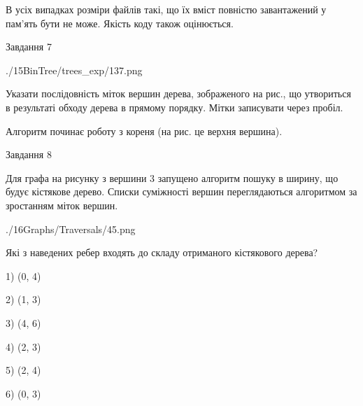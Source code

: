 \documentclass[12pt, ukrainian]{article}
\begin{document}
{В усіх випадках розміри файлів такі, що їх вміст повністю завантажений у пам'ять бути не може. Якість коду також оцінюється.



\vspace{10mm}\par

\newpage
\begin{minipage}[t]{9.7cm}
               
{\begin{center}Завдання {7}\end{center}}
\vspace{-6mm}

\begin{center}
	{./15BinTree/trees_exp/137.png}
\end{center}
Указати послідовність міток вершин дерева, зображеного на рис., що утвориться в результаті обходу дерева в прямому порядку. Мітки записувати через пробіл.\par Алгоритм починає роботу з кореня (на рис. це верхня вершина).\par

\end{minipage}
\vline \hspace{8mm}
\begin{minipage}[t]{8.0cm}
               
{\begin{center}Завдання {8}\end{center}}
\vspace{-6mm}
Для графа на рисунку з вершини 3 запущено алгоритм пошуку в ширину, що будує кістякове дерево. Списки суміжності вершин переглядаються алгоритмом за зростанням міток вершин.\par
\begin{center}
	{./16Graphs/Traversals/45.png}
\end{center}
\par Які з наведених ребер входять до складу отриманого кістякового дерева?\par
1) (0, 4)\par
2) (1, 3)\par
3) (4, 6)\par
4) (2, 3)\par
5) (2, 4)\par
6) (0, 3)\par
{\vskip 15pt} \par


\end{minipage}}
\end{document}
